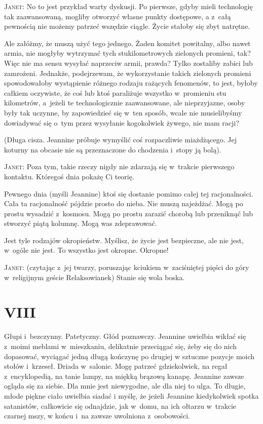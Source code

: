 \documentclass[oneside,polish,12pt,sfheadings]{mwbk}
\begin{document}
\textsc{Janet}: No to jest przykład warty dyskusji. Po pierwsze, gdyby mieli
technologię tak zaawansowaną, mogliby otworzyć własne punkty dostępowe,
a z~całą pewnością nie możemy patrzeć wszędzie ciągle. Życie stałoby
się zbyt natrętne.

Ale załóżmy, że muszą użyć tego jednego. Żaden komitet powitalny,
albo nawet armia, nie mogłyby wytrzymać tych stukilometrowych zielonych
promieni, tak? Więc nie ma sensu wysyłać naprzeciw armii, prawda?
Tylko zostaliby zabici lub zamrożeni. Jednakże, podejrzewam, że wykorzystanie
takich zielonych promieni spowodowałoby wystąpienie różnego rodzaju
rażących fenomenów, to jest, byłoby całkiem oczywiste, że coś lub
ktoś paraliżuje wszystko w~promieniu stu kilometrów, a~jeżeli te technologicznie
zaawansowane, ale nieprzyjazne, osoby były tak uczynne, by zapowiedzieć
się w~ten sposób, wcale nie musielibyśmy dowiadywać się o~tym przez
wysyłanie kogokolwiek żywego, nie mam racji?

(Długa cisza. Jeannine próbuje wymyślić coś rozpaczliwie miażdżącego. Jej koturny na obcasie nie są przeznaczone do chodzenia i~stopy ją
bolą).

\textsc{Janet}: Poza tym, takie rzeczy nigdy nie zdarzają się w~trakcie pierwszego
kontaktu. Któregoś dnia pokażę Ci teorię.

Pewnego dnia (myśli Jeannine) ktoś się dostanie pomimo całej tej racjonalności.
Cała ta racjonalność pójdzie prosto do nieba. Nie muszą najeżdżać.
Mogą po prostu wysadzić z~kosmosu. Mogą po prostu zarazić chorobą
lub przeniknąć lub stworzyć piątą kolumnę. Mogą was zdeprawować.

Jest tyle rodzajów okropieństw. Myślisz, że życie jest bezpieczne,
ale nie jest, w~ogóle nie jest. To wszystko jest okropne. Okropne!

\textsc{Janet}: (czytając z~jej twarzy, poruszając kciukiem w~zaciśniętej pięści
do góry w~religijnym geście Relaksowianek) Stanie się wola boska.

\chapter{VIII}

Głupi i~bezczynny. Patetyczny. Głód poznawczy. Jeannine uwielbia wikłać
się z~moimi meblami w~mieszkaniu, delikatnie przeciągać się, żeby
się do nich dopasować, wyciągać jedną długą kończynę po drugiej w
sztuczne pozycje moich stołów i~krzeseł. Driada w~salonie. Mogę patrzeć
gdziekolwiek, na regał z~encyklopedią, na tanie lampy, na miękką brązową
kanapę. Jeannine zawsze ogląda się za siebie. Dla mnie jest niewygodne,
ale dla niej to ulga. To długie, młode piękne ciało uwielbia siadać
i myślę, że jeżeli Jeannine kiedykolwiek spotka satanistów, całkowicie
się odnajdzie, jak w~domu, na ich ołtarzu w~trakcie czarnej mszy,
w końcu i~na zawsze uwolniona z~osobowości.
\end{document}
